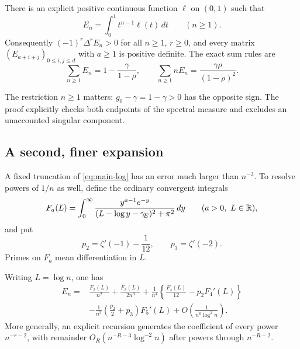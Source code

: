 \begin{theorem}
\label{thm:main-moment}
There is an explicit positive continuous function $\ell$ on $(0,1)$
such that
\begin{equation}\label{eq:main-moment}
 E_n=\int_0^1 t^{n-1}\ell(t)\,dt\qquad(n\ge1).
\end{equation}
Consequently $(-1)^r\Delta^r E_n>0$ for all $n\ge1$, $r\ge0$,
and every matrix $(E_{a+i+j})_{0\le i,j\le d}$ with $a\ge1$ is
positive definite. The exact sum rules are
\begin{equation}\label{eq:main-sums}
 \sum_{n\ge1}E_n=1-\frac\gamma{1-\rho},\qquad
 \sum_{n\ge1}nE_n=\frac{\gamma\rho}{(1-\rho)^2}.
\end{equation}
\end{theorem}

The restriction $n\ge1$ matters: $g_0-\gamma=1-\gamma>0$ has the
opposite sign. The proof explicitly checks both endpoints of the
spectral measure and excludes an unaccounted singular component.

\subsection{A second, finer expansion}

A fixed truncation of \eqref{eq:main-log} has an error much larger
than $n^{-3}$. To resolve powers of $1/n$ as well, define the ordinary
convergent integrals
\begin{equation}\label{eq:def-Fa}
 F_a(L)=\int_0^\infty
 \frac{y^{a-1}e^{-y}}{(L-\log y-\gamma_{\!E})^2+\pi^2}\,dy
 \qquad(a>0,\ L\in\mathbb R),
\end{equation}
and put
\begin{equation}\label{eq:p2p3}
 p_2=\zeta'(-1)-\frac1{12},\qquad p_3=\zeta'(-2).
\end{equation}
Primes on $F_a$ mean differentiation in $L$.

\begin{theorem}
\label{thm:main-sectors}
Writing $L=\log n$, one has
\begin{align}\label{eq:main-sectors}
 E_n={}&\frac{F_2(L)}{n^2}+\frac{F_3(L)}{2n^3}
   +\frac1{n^4}\left\{\frac{F_4(L)}{12}-p_2F_4'(L)\right\}\nonumber\\
 &-\frac1{n^5}\left(\frac{p_2}{2}+p_3\right)F_5'(L)
   +O\!\left(\frac1{n^6\log^2n}\right).
\end{align}
More generally, an explicit recursion generates the coefficient of
every power $n^{-r-2}$, with remainder
$O_R(n^{-R-3}\log^{-2}n)$ after powers through $n^{-R-2}$.
\end{theorem}

